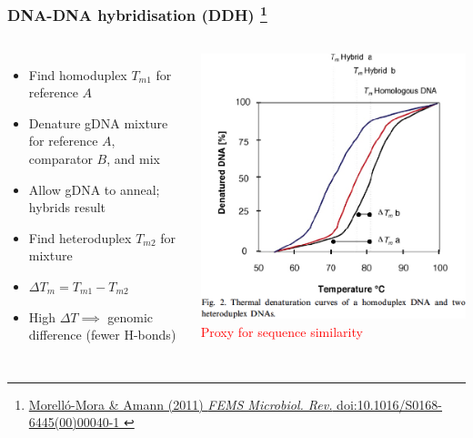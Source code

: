%
\begin{frame}
  \frametitle{DNA-DNA hybridisation (DDH)
  \footnote{\tiny{\href{http://dx.doi.org/10.1016/S0168-6445(00)00040-1
}{Morell\'{o}-Mora \& Amann (2011) \textit{FEMS Microbiol. Rev.} doi:10.1016/S0168-6445(00)00040-1
}}}
  }
  \begin{columns}[T] 
      \begin{itemize}
        \item \textcolor{RawSienna}{Find homoduplex $T_{m1}$ for reference $A$}
        \item \textcolor{hutton_green}{Denature gDNA mixture for reference $A$, comparator $B$, and mix}
        \item \textcolor{hutton_green}{Allow gDNA to anneal; hybrids result}
        \item \textcolor{RawSienna}{Find heteroduplex $T_{m2}$ for mixture}
        \item \textcolor{hutton_blue}{$\Delta T_{m} = T_{m1} - T_{m2}$}        
        \item \textcolor{hutton_purple}{High $\Delta T \implies$ genomic difference (fewer H-bonds)}        
      \end{itemize}
      \includegraphics[width=\textwidth]{images/dna-dna_graph} \\
      \textcolor{red}{Proxy for sequence similarity}
  \end{columns}    
\end{frame}

